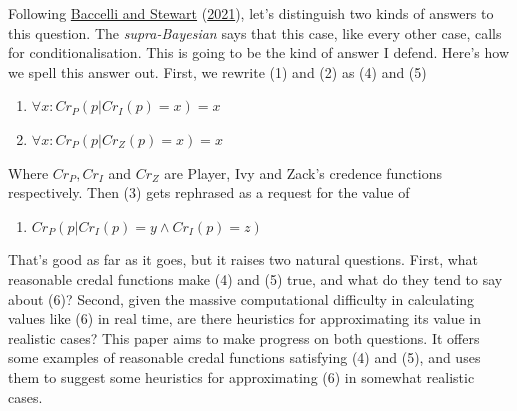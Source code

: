 \documentclass[
  12pt,
]{article}
\providecommand{\tightlist}{%
  \setlength{\itemsep}{0pt}\setlength{\parskip}{0pt}}
\begin{document}
Following \protect\hyperlink{ref-BaccelliStewart2021}{Baccelli and
Stewart} (\protect\hyperlink{ref-BaccelliStewart2021}{2021}), let's
distinguish two kinds of answers to this question. The
\emph{supra-Bayesian} says that this case, like every other case, calls
for conditionalisation. This is going to be the kind of answer I defend.
Here's how we spell this answer out. First, we rewrite (1) and (2) as
(4) and (5)

\begin{enumerate}
\def\labelenumi{(\arabic{enumi})}
\setcounter{enumi}{3}
\tightlist
\item
  \(\forall x: Cr_P(p | Cr_I(p) = x) = x\)
\item
  \(\forall x: Cr_P(p | Cr_Z(p) = x) = x\)
\end{enumerate}

Where \(Cr_P, Cr_I\) and \(Cr_Z\) are Player, Ivy and Zack's credence
functions respectively. Then (3) gets rephrased as a request for the
value of

\begin{enumerate}
\def\labelenumi{(\arabic{enumi})}
\setcounter{enumi}{5}
\tightlist
\item
  \(Cr_P(p | Cr_I(p) = y \wedge Cr_I(p) = z)\)
\end{enumerate}

That's good as far as it goes, but it raises two natural questions.
First, what reasonable credal functions make (4) and (5) true, and what
do they tend to say about (6)? Second, given the massive computational
difficulty in calculating values like (6) in real time, are there
heuristics for approximating its value in realistic cases? This paper
aims to make progress on both questions. It offers some examples of
reasonable credal functions satisfying (4) and (5), and uses them to
suggest some heuristics for approximating (6) in somewhat realistic
cases.
\end{document}
